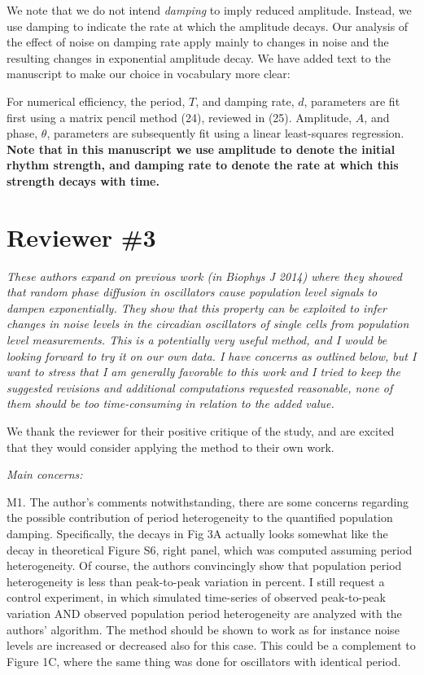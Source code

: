 \documentclass[11pt, letterpaper]{article}
\newenvironment{reviewer}{\itshape\color{gray}}{}
\newenvironment{manuscript}[1]{\begin{center}\begin{tcolorbox}[colback=green!5!white,colframe=green!75!black,width=\textwidth,title={#1},breakable,fonttitle=\bfseries]}{\end{tcolorbox}\end{center}}
\begin{document}
We note that we do not intend {\itshape damping} to imply reduced amplitude.
Instead, we use damping to indicate the rate at which the amplitude decays.
Our analysis of the effect of noise on damping rate apply mainly to changes in noise and the resulting changes in exponential amplitude decay. We have added text to the manuscript to make our choice in vocabulary more clear:

\begin{manuscript}{Page 10}
 For numerical efficiency, the period, $T$, and damping rate, $d$, parameters are fit first using a matrix pencil method (24), reviewed in (25).
Amplitude, $A$, and phase, $\theta$, parameters are subsequently fit using a linear least-squares regression.
{\bfseries
Note that in this manuscript we use amplitude to denote the initial rhythm strength, and damping rate to denote the rate at which this strength decays with time.}
\end{manuscript}

\section*{Reviewer \#3}

\begin{reviewer}
These authors expand on previous work (in Biophys J 2014) where they showed that random phase diffusion in oscillators cause population level signals to dampen exponentially. They show that this property can be exploited to infer changes in noise levels in the circadian oscillators of single cells from population level measurements. This is a potentially very useful method, and I would be looking forward to try it on our own data. I have concerns as outlined below, but I want to stress that I am generally favorable to this work and I tried to keep the suggested revisions and additional computations requested reasonable, none of them should be too time-consuming in relation to the added value.
\end{reviewer}

We thank the reviewer for their positive critique of the study, and are excited that they would consider applying the method to their own work.

\begin{reviewer}
Main concerns:

M1. The author's comments notwithstanding, there are some concerns regarding the possible contribution of period heterogeneity to the quantified population damping. Specifically, the decays in Fig 3A actually looks somewhat like the decay in theoretical Figure S6, right panel, which was computed assuming period heterogeneity. Of course, the authors convincingly show that population period heterogeneity is less than peak-to-peak variation in percent. I still request a control experiment, in which simulated time-series of observed peak-to-peak variation AND observed population period heterogeneity are analyzed with the authors' algorithm. The method should be shown to work as for instance noise levels are increased or decreased also for this case. This could be a complement to Figure 1C, where the same thing was done for oscillators with identical period.
\end{reviewer}
\end{document}
